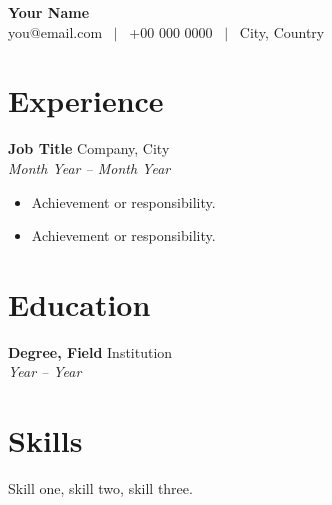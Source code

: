 \documentclass[11pt,a4paper]{article}
\begin{document}
\begin{center}
{\LARGE \bfseries Your Name} \\[4pt]
you@email.com \ $\vert$ \ +00 000 0000 \ $\vert$ \ City, Country
\end{center}

\section*{Experience}
\textbf{Job Title} \hfill Company, City \\
\textit{Month Year -- Month Year}
\begin{itemize}
\item Achievement or responsibility.
\item Achievement or responsibility.
\end{itemize}

\section*{Education}
\textbf{Degree, Field} \hfill Institution \\
\textit{Year -- Year}

\section*{Skills}
Skill one, skill two, skill three.
\end{document}
